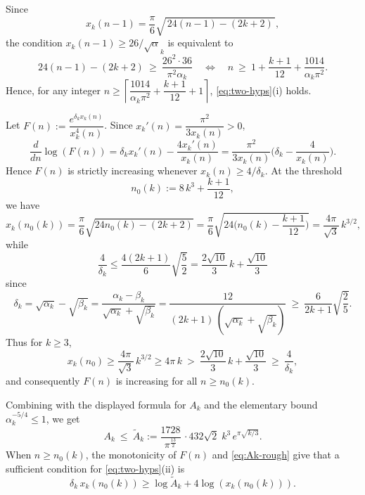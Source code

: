 \documentclass[12pt]{article}
\numberwithin{equation}{section}
\begin{document}
Since
\[
x_k(n-1)=\frac{\pi}{6}\sqrt{\,24(n-1)-(2k+2)\,},
\]
the condition $x_k(n-1)\ge 26/\sqrt\alpha_k$ is equivalent to
\[
24(n-1)-(2k+2)\ \ge\ \frac{26^2\cdot 36}{\pi^2\alpha_k}
\quad\Longleftrightarrow\quad
n\ \ge\ 1+\frac{k+1}{12}+\frac{1014}{\alpha_k\pi^2}.
\]
Hence, for any integer $n\ge \left\lceil \dfrac{1014}{\alpha_k\pi^2}+\dfrac{k+1}{12}+1\right\rceil$,
\eqref{eq:two-hyps}(i) holds.


Let $F(n):=\dfrac{e^{\delta_k x_k(n)}}{x_k^4(n)}$. Since $x_k'(n)=\dfrac{\pi^2}{3x_k(n)}>0$,
\[
\frac{d}{dn}\log \left(F(n)\right)=\delta_k x_k'(n)-\frac{4x_k'(n)}{x_k(n)}
=\frac{\pi^2}{3x_k(n)}\Big(\delta_k-\frac{4}{x_k(n)}\Big).
\]
Hence $F(n)$ is strictly increasing whenever $x_k(n)\ge 4/\delta_k$. At the threshold
\[
n_0(k):=8\,k^{3}+\frac{k+1}{12},%
\]
we have
\begin{equation}\label{eq:x0}
x_k\left(n_0(k)\right)=\frac{\pi}{6}\sqrt{24n_0(k)-(2k+2)}
= \frac{\pi}{6}\sqrt{24\Big(n_0(k)-\frac{k+1}{12}\Big)}
=\frac{4\pi}{\sqrt{3}}\,k^{3/2},
\end{equation}
while
\[
\frac{4}{\delta_k} \le \frac{4(2k+1)}{6}\sqrt{\frac{5}{2}}
= \frac{2\sqrt{10}}{3}\,k+\frac{\sqrt{10}}{3}
\]
since
\begin{equation}\label{bound-deltak}
\delta_k=\sqrt{\alpha_k}-\sqrt{\beta_k}=\frac{\alpha_k-\beta_k}{\sqrt{\alpha_k}+\sqrt{\beta_k}}
=\frac{12}{(2k+1)\,(\sqrt{\alpha_k}+\sqrt{\beta_k})}
\ \ge\ \frac{6}{2k+1}\sqrt{\frac{2}{5}}.
\end{equation}
Thus for $k\ge3$,
\[
x_k(n_0) \ge \frac{4\pi}{\sqrt{3}}\,k^{3/2} \ge 4\pi\,k\ >\ \frac{2\sqrt{10}}{3}\,k+\frac{\sqrt{10}}{3}\ \ge\ \frac{4}{\delta_k},
\]
and consequently $F(n)$ is increasing for all $n\ge n_0(k)$.

Combining with the displayed formula for $A_k$ and the elementary bound
$\alpha_k^{-5/4}\le1$, we get
\begin{equation}\label{eq:Ak-rough}
A_k\ \le\ \widetilde{A}_k:=\frac{1728}{\pi^{\frac{13}{2}}}\,\cdot 432\sqrt{2}\;k^{3}\,e^{\pi\sqrt{k/3}}.
\end{equation}
When $n\ge n_0(k)$, the monotonicity of $F(n)$ and \eqref{eq:Ak-rough} give that a sufficient condition for \eqref{eq:two-hyps}(ii) is
\begin{equation}\label{eq:key-ineq-sufficient}
\delta_k\,x_k(n_0(k)) \ge \log \widetilde{A}_k+4\log\left( x_k(n_0(k))\right).
\end{equation}
\end{document}
